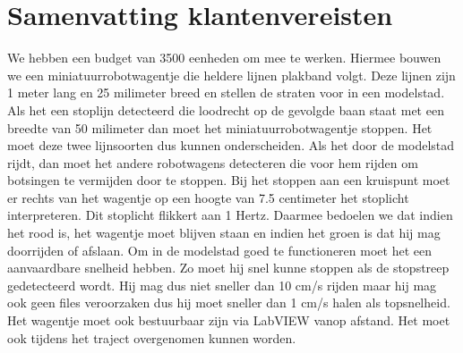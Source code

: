 \documentclass{article}
\begin{document}
	\section*{Samenvatting klantenvereisten}
	
	We hebben een budget van 3500 eenheden om mee te werken. Hiermee bouwen we een miniatuurrobotwagentje die heldere lijnen plakband volgt. Deze lijnen zijn 1 meter lang en 25 milimeter breed en stellen de straten voor in een modelstad. Als het een stoplijn detecteerd die loodrecht op de gevolgde baan staat met een breedte van 50 milimeter dan moet het miniatuurrobotwagentje stoppen. Het moet deze twee lijnsoorten dus kunnen onderscheiden. Als het door de modelstad rijdt, dan moet het andere robotwagens detecteren die voor hem rijden om botsingen te vermijden door te stoppen. Bij het stoppen aan een kruispunt moet er rechts van het wagentje op een hoogte van 7.5 centimeter het stoplicht interpreteren. Dit stoplicht flikkert aan 1 Hertz. Daarmee bedoelen we dat indien het rood is, het wagentje moet blijven staan en indien het groen is dat hij mag doorrijden of afslaan. Om in de modelstad goed te functioneren moet het een aanvaardbare snelheid hebben. Zo moet hij snel kunne stoppen als de stopstreep gedetecteerd wordt. Hij mag dus niet sneller dan 10 cm/s rijden maar hij mag ook geen files veroorzaken dus hij moet sneller dan 1 cm/s halen als topsnelheid. Het wagentje moet ook bestuurbaar zijn via LabVIEW vanop afstand. Het moet ook tijdens het traject overgenomen kunnen worden.
	
	
	
	
	
	
	
	
	
	
	
	
\end{document}
